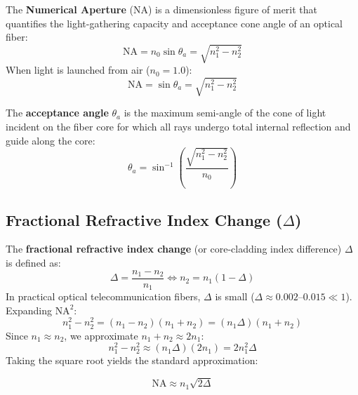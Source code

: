 \begin{definition}
The \textbf{Numerical Aperture} ($\text{NA}$) is a dimensionless figure of merit that quantifies the light-gathering capacity and acceptance cone angle of an optical fiber:
\begin{equation}
    \text{NA} = n_0 \sin\theta_a = \sqrt{n_1^2 - n_2^2}
\end{equation}
When light is launched from air ($n_0 = 1.0$):
\begin{equation}
    \text{NA} = \sin\theta_a = \sqrt{n_1^2 - n_2^2}
\end{equation}
\end{definition}

\begin{definition}
The \textbf{acceptance angle} $\theta_a$ is the maximum semi-angle of the cone of light incident on the fiber core for which all rays undergo total internal reflection and guide along the core:
\begin{equation}
    \theta_a = \sin^{-1}\left(\frac{\sqrt{n_1^2 - n_2^2}}{n_0}\right)
\end{equation}
\end{definition}

\subsection{Fractional Refractive Index Change (\texorpdfstring{$\Delta$}{Delta})}
The \textbf{fractional refractive index change} (or core-cladding index difference) $\Delta$ is defined as:
\begin{equation}
    \Delta = \frac{n_1 - n_2}{n_1} \iff n_2 = n_1(1 - \Delta)
\end{equation}
In practical optical telecommunication fibers, $\Delta$ is small ($\Delta \approx 0.002\text{--}0.015 \ll 1$). Expanding $\text{NA}^2$:
\begin{equation}
    n_1^2 - n_2^2 = (n_1 - n_2)(n_1 + n_2) = (n_1 \Delta)(n_1 + n_2)
\end{equation}
Since $n_1 \approx n_2$, we approximate $n_1 + n_2 \approx 2n_1$:
\begin{equation}
    n_1^2 - n_2^2 \approx (n_1 \Delta)(2n_1) = 2 n_1^2 \Delta
\end{equation}
Taking the square root yields the standard approximation:

\begin{keyequation}
\begin{equation}
    \text{NA} \approx n_1 \sqrt{2\Delta}
\end{equation}
\end{keyequation}

